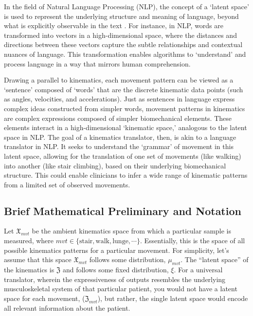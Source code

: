 In the field of Natural Language Processing (NLP), the concept of a `latent space' is used to represent the underlying structure and meaning of language, beyond what is explicitly observable in the text \cite{jurafskySpeechLanguageProcessing2009}.
For instance, in NLP, words are transformed into vectors in a high-dimensional space, where the distances and directions between these vectors capture the subtle relationships and contextual nuances of language.
This transformation enables algorithms to `understand' and process language in a way that mirrors human comprehension.

Drawing a parallel to kinematics, each movement pattern can be viewed as a `sentence' composed of `words' that are the discrete kinematic data points (such as angles, velocities, and accelerations).
Just as sentences in language express complex ideas constructed from simpler words, movement patterns in kinematics are complex expressions composed of simpler biomechanical elements.
These elements interact in a high-dimensional `kinematic space,' analogous to the latent space in NLP.
The goal of a kinematics translator, then, is akin to a language translator in NLP.
It seeks to understand the `grammar' of movement in this latent space, allowing for the translation of one set of movements (like walking) into another (like stair climbing), based on their underlying biomechanical structure.
This could enable clinicians to infer a wide range of kinematic patterns from a limited set of observed movements.


\subsection{Brief Mathematical Preliminary and Notation}
Let $\mathfrak{X}_{mvt}$ be the ambient kinematics space from which a particular sample is measured, where $mvt \in \{\text{stair},\text{walk}, \text{lunge}, \cdots\}$.
Essentially, this is the space of all possible kinematics patterns for a particular movement.
For simplicity, let's assume that this space $\mathfrak{X}_{mvt}$ follows some distribution, $\mu_{mvt}$.
The ``latent space'' of the kinematics is $\mathfrak{Z}$ and follows some fixed distribution, $\xi$.
For a universal translator, wherein the expressiveness of outputs resembles the underlying musculoskeletal system of that particular patient, you would not have a latent space for each movement, ($\mathfrak{Z}_{mvt}$), but rather, the single latent space would encode all relevant information about the patient.

